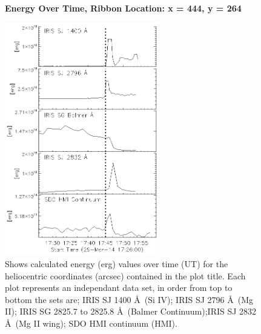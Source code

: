 \begin{figure}[H]
  \begin{center}
  \textbf{Energy Over Time, Ribbon Location: x = 444, y = 264 }\par\medskip
  \includegraphics[width=0.6\textwidth]{29-Mar-14-Ribbon-xyPosition-499-264-Frame-2-Energy-Ladder}
  \end{center}
  \caption{Shows calculated energy (erg) values over time (UT) for the heliocentric coordinates (arcsec) contained in the plot title. Each plot represents an independant data set, in order from top to bottom the sets are; IRIS SJ 1400 \AA\ (Si IV); IRIS SJ 2796 \AA\ (Mg II); IRIS SG  2825.7 to 2825.8 \AA\ (Balmer Continuum);IRIS SJ 2832 \AA\ (Mg II wing); SDO HMI continuum (HMI).}\label{erb16}
\end{figure}

